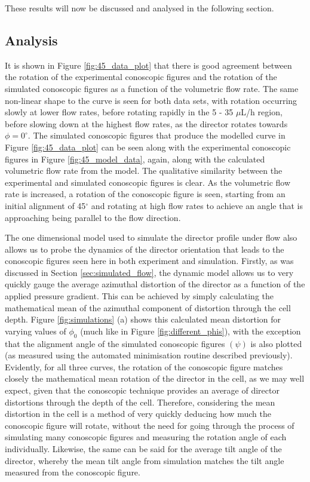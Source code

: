 These results will now be discussed and analysed in the following section.

\subsection{Analysis}
\label{sec:analysis}
It is shown in Figure \ref{fig:45_data_plot} that there is good agreement between the rotation of the experimental conoscopic figures and the rotation of the simulated conoscopic figures as a function of the volumetric flow rate. The same non-linear shape to the curve is seen for both data sets, with rotation occurring slowly at lower flow rates, before rotating rapidly in the 5 - 35 $\mu$L/h region, before slowing down at the highest flow rates, as the director rotates towards $\phi=0^{\circ}$. The simulated conoscopic figures that produce the modelled curve in Figure \ref{fig:45_data_plot} can be seen along with the experimental conoscopic figures in Figure \ref{fig:45_model_data}, again, along with the calculated volumetric flow rate from the model. The qualitative similarity between the experimental and simulated conoscopic figures is clear. As the volumetric flow rate is increased, a rotation of the conoscopic figure is seen, starting from an initial alignment of 45$^{\circ}$ and rotating at high flow rates to achieve an angle that is approaching being parallel to the flow direction.

The one dimensional model used to simulate the director profile under flow also allows us to probe the dynamics of the director orientation that leads to the conoscopic figures seen here in both experiment and simulation. Firstly, as was discussed  in Section \ref{sec:simulated_flow}, the dynamic model allows us to very quickly gauge the average azimuthal distortion of the director as a function of the applied pressure gradient. This can be achieved by simply calculating the mathematical mean of the azimuthal component of distortion through the cell depth. Figure \ref{fig:simulations} (a) shows this calculated mean distortion for varying values of $\phi_0$ (much like in Figure \ref{fig:different_phis}), with the exception that the alignment angle of the simulated conoscopic figures $\left(\psi\right)$ is also plotted (as measured using the automated minimisation routine described previously). Evidently, for all three curves, the rotation of the conoscopic figure matches closely the mathematical mean rotation of the director in the cell, as we may well expect, given that the conoscopic technique provides an average of director distortions through the depth of the cell. Therefore, considering the mean distortion in the cell is a method of very quickly deducing how much the conoscopic figure will rotate, without the need for going through the process of simulating many conoscopic figures and measuring the rotation angle of each individually. Likewise, the same can be said for the average tilt angle of the director, whereby the mean tilt angle from simulation matches the tilt angle measured from the conoscopic figure.

